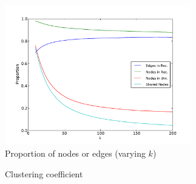 \documentclass[conference]{IEEEtran}
\begin{document}
\begin{figure}[!t]
\centering
\includegraphics[width=3.2in]{proportion_edgesnodes_k}                
\caption{Proportion of nodes or edges (varying $k$)}
\label{fig_rur_propk}
\end{figure}

%

\begin{figure}[!t]
\centering
{}                
\caption{Clustering coefficient}
\label{fig_rur_cc}
\end{figure}

%
\end{document}
